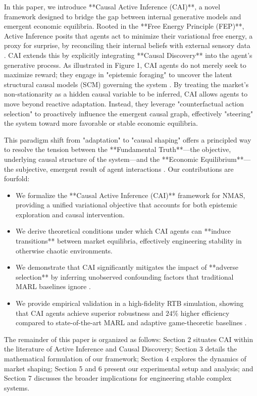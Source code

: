 In this paper, we introduce **Causal Active Inference (CAI)**, a novel framework designed to bridge the gap between internal generative models and emergent economic equilibria. Rooted in the **Free Energy Principle (FEP)**, Active Inference posits that agents act to minimize their variational free energy, a proxy for surprise, by reconciling their internal beliefs with external sensory data \cite{Friston2010, Smith2024}. CAI extends this by explicitly integrating **Causal Discovery** into the agent's generative process. As illustrated in Figure 1, CAI agents do not merely seek to maximize reward; they engage in "epistemic foraging" to uncover the latent structural causal models (SCM) governing the system \cite{Chen2024CAI}. By treating the market's non-stationarity as a hidden causal variable to be inferred, CAI allows agents to move beyond reactive adaptation. Instead, they leverage "counterfactual action selection" to proactively influence the emergent causal graph, effectively "steering" the system toward more favorable or stable economic equilibria.

This paradigm shift from "adaptation" to "causal shaping" offers a principled way to resolve the tension between the **Fundamental Truth**—the objective, underlying causal structure of the system—and the **Economic Equilibrium**—the subjective, emergent result of agent interactions \cite{Hayek1945, Geyer2021}. Our contributions are fourfold:
\begin{itemize}
    \item We formalize the **Causal Active Inference (CAI)** framework for NMAS, providing a unified variational objective that accounts for both epistemic exploration and causal intervention.
    \item We derive theoretical conditions under which CAI agents can **induce transitions** between market equilibria, effectively engineering stability in otherwise chaotic environments.
    \item We demonstrate that CAI significantly mitigates the impact of **adverse selection** by inferring unobserved confounding factors that traditional MARL baselines ignore \cite{Zhang2021}.
    \item We provide empirical validation in a high-fidelity RTB simulation, showing that CAI agents achieve superior robustness and $24\%$ higher efficiency compared to state-of-the-art MARL and adaptive game-theoretic baselines \cite{Lowe2017, Foerster2018}.
\end{itemize}

The remainder of this paper is organized as follows: Section 2 situates CAI within the literature of Active Inference and Causal Discovery; Section 3 details the mathematical formulation of our framework; Section 4 explores the dynamics of market shaping; Section 5 and 6 present our experimental setup and analysis; and Section 7 discusses the broader implications for engineering stable complex systems.